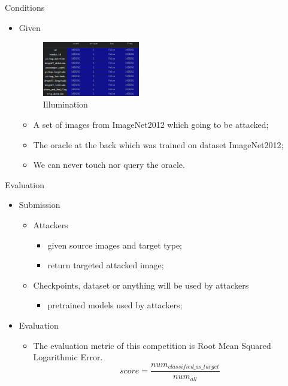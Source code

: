 \documentclass[
 size=12pt,
 paper=smartboard, %
 mode=present, %
 display=slides, %
style=tuliplab,
pauseslide,
fleqn,leqno]{powerdot}
\begin{document}
\begin{slide}{Conditions}
  \begin{itemize}
    \item Given \pause
    \begin{figure}[h]
      \centering
      \includegraphics[width=0.4\textwidth]{figures2/train_null.eps}
      \caption{Illumination}
      \label{fig:missing-value-pic}
    \end{figure} \pause
    \begin{itemize}
      \item A set of images from ImageNet2012 which going to be attacked; \pause 
      \item The oracle at the back which was trained on dataset ImageNet2012; \pause
      \item We can never touch nor query the oracle.
    \end{itemize}
  \end{itemize}
\end{slide}

\begin{slide}{Evaluation}
  \begin{itemize}
    \item Submission \pause
    \begin{itemize}
      \item Attackers \pause
      \begin{itemize}
        \item given source images and target type; \pause
        \item return targeted attacked image; \pause
      \end{itemize}
      \item Checkpoints, dataset or anything will be used by attackers \pause
      \begin{itemize}
        \item pretrained models used by attackers; \pause
      \end{itemize}
    \end{itemize}
  \end{itemize}
  \begin{itemize}
    \item Evaluation \pause
    \begin{itemize}
      \item The evaluation metric of this competition is Root Mean Squared Logarithmic Error.
      $$
      score = \frac{num_{classified\_as\_target}}{num_{all}}
      $$ 
    \end{itemize}
  \end{itemize}
\end{slide}
\end{document}
